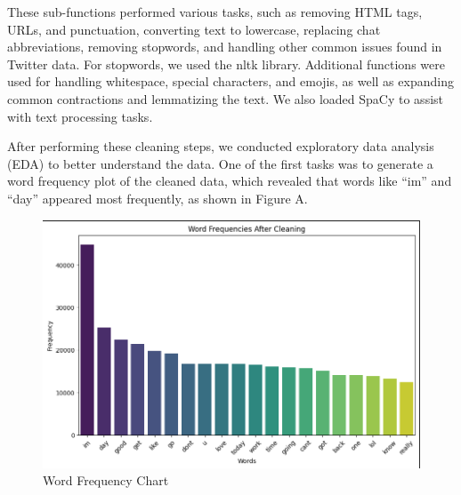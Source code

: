 \documentclass[conference]{IEEEtran}
\begin{document}
 These sub-functions performed various tasks, such as removing HTML tags, URLs, and punctuation, converting text to lowercase, replacing chat abbreviations, 
 removing stopwords, and handling other common issues found in Twitter data. For stopwords, we used the nltk library. 
 Additional functions were used for handling whitespace, special characters, and emojis, as well as expanding common contractions and lemmatizing the text.
  We also loaded SpaCy to assist with text processing tasks.

After performing these cleaning steps, we conducted exploratory data analysis (EDA) to better understand the data. 
One of the first tasks was to generate a word frequency plot of the cleaned data, which revealed that words like “im” and “day” appeared most frequently, 
as shown in Figure A. \\
\begin{figure}[H]
        \centering
        \includegraphics[width=\linewidth]{assets/Word_Freq_Chart.png}
        \caption{Word Frequency Chart}
        \label{fig:word_freq_chart}
    \end{figure}
      
\end{document}
